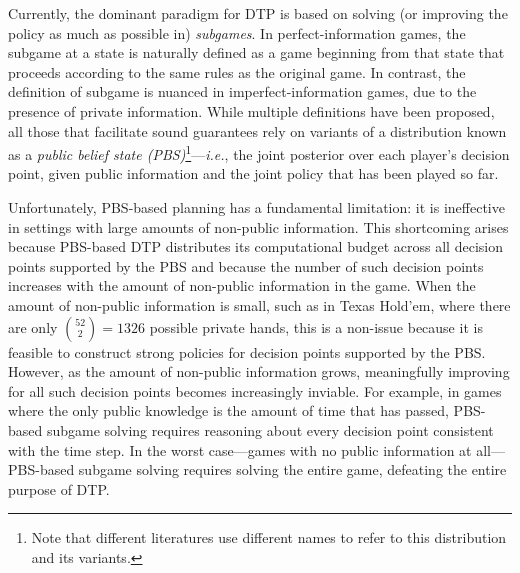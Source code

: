 \documentclass{article} %
\theoremstyle{plain}
\theoremstyle{definition}
\theoremstyle{remark}
\begin{document}
Currently, the dominant paradigm for DTP is based on solving (or improving the policy as much as possible in) \textit{subgames}.
In perfect-information games, the subgame at a state is naturally defined as a game beginning from that state that proceeds according to the same rules as the original game.
In contrast, the definition of subgame is nuanced in imperfect-information games, due to the presence of private information.
While multiple definitions have been proposed, all those that facilitate sound guarantees \citep{nayyar,Dibangoye,Oliehoek2013SufficientPS,cfrd,maxmargin,safenested,deepstack,brown2020rebel,sokota2023abstracting} rely on variants of a distribution known as a \textit{public belief state (PBS)}\footnote{Note that different literatures use different names to refer to this distribution and its variants.}---\emph{i.e.}, the joint posterior over each player's decision point, given public information and the joint policy that has been played so far.

Unfortunately, PBS-based planning has a fundamental limitation: it is ineffective in settings with large amounts of non-public information.
This shortcoming arises because PBS-based DTP distributes its computational budget across all decision points supported by the PBS and because the number of such decision points increases with the amount of non-public information in the game.
When the amount of non-public information is small, such as in Texas Hold'em, where there are only ${52 \choose 2} = 1326$ possible private hands, this is a non-issue because it is feasible to construct strong policies for decision points supported by the PBS.
However, as the amount of non-public information grows, meaningfully improving for all such decision points becomes increasingly inviable.
For example, in games where the only public knowledge is the amount of time that has passed, PBS-based subgame solving requires reasoning about every decision point consistent with the time step.
In the worst case---games with no public information at all---PBS-based subgame solving requires solving the entire game, defeating the entire purpose of DTP.
\end{document}
